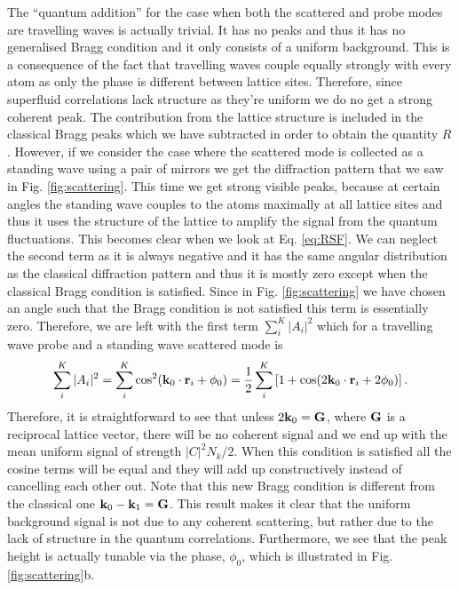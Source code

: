 The ``quantum addition'' for the case when both the scattered and
probe modes are travelling waves is actually trivial. It has no peaks
and thus it has no generalised Bragg condition and it only consists of
a uniform background. This is a consequence of the fact that
travelling waves couple equally strongly with every atom as only the
phase is different between lattice sites. Therefore, since superfluid
correlations lack structure as they're uniform we do no get a strong
coherent peak. The contribution from the lattice structure is included
in the classical Bragg peaks which we have subtracted in order to
obtain the quantity $R$. However, if we consider the case where the
scattered mode is collected as a standing wave using a pair of mirrors
we get the diffraction pattern that we saw in
Fig. \ref{fig:scattering}. This time we get strong visible peaks,
because at certain angles the standing wave couples to the atoms
maximally at all lattice sites and thus it uses the structure of the
lattice to amplify the signal from the quantum fluctuations. This
becomes clear when we look at Eq. \eqref{eq:RSF}. We can neglect the
second term as it is always negative and it has the same angular
distribution as the classical diffraction pattern and thus it is
mostly zero except when the classical Bragg condition is
satisfied. Since in Fig. \ref{fig:scattering} we have chosen an angle
such that the Bragg condition is not satisfied this term is
essentially zero. Therefore, we are left with the first term
$\sum_i^K |A_i|^2$ which for a travelling wave probe and a standing
wave scattered mode is
\begin{equation}
  \sum_i^K |A_i|^2 = \sum_i^K \cos^2(\mathbf{k}_0 \cdot \mathbf{r}_i + \phi_0) =
  \frac{1}{2} \sum_i^K \left[1 + \cos(2 \mathbf{k}_0 \cdot \mathbf{r}_i + 2
    \phi_0) \right].
\end{equation}
Therefore, it is straightforward to see that unless
$2 \mathbf{k}_0 = \mathbf{G}$, where $\mathbf{G}$ is a reciprocal lattice vector,
there will be no coherent signal and we end up with the mean uniform
signal of strength $|C|^2 N_k/2$. When this condition is satisfied all
the cosine terms will be equal and they will add up constructively
instead of cancelling each other out. Note that this new Bragg
condition is different from the classical one
$\mathbf{k}_0 - \mathbf{k}_1 = \mathbf{G}$. This result makes it clear that the
uniform background signal is not due to any coherent scattering, but
rather due to the lack of structure in the quantum
correlations. Furthermore, we see that the peak height is actually
tunable via the phase, $\phi_0$, which is illustrated in
Fig. \ref{fig:scattering}b.

